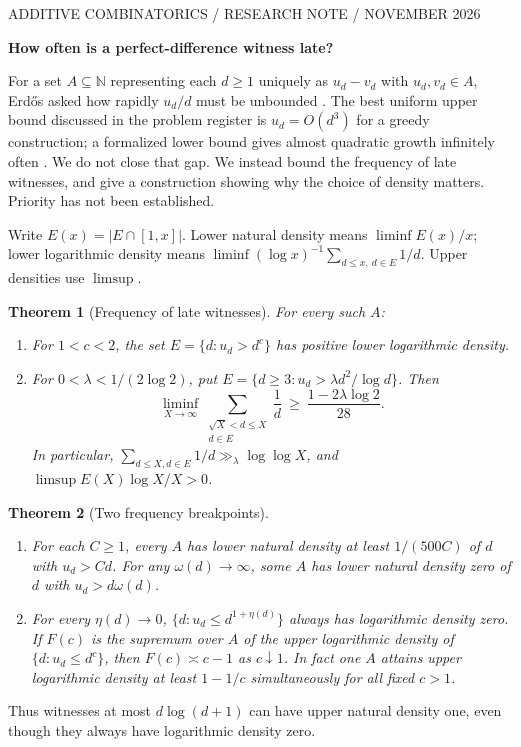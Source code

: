 \documentclass[10pt,a4paper]{article}
\newtheorem{theorem}{Theorem}
\newcommand{\N}{\mathbb N}
\begin{document}
{\small\sffamily\color{ink} ADDITIVE COMBINATORICS \quad / \quad RESEARCH NOTE \quad /  NOVEMBER 2026}
\vspace{3mm}
\begin{center}{\LARGE\bfseries How often is a perfect-difference witness late?}\end{center}
For a set $A\subseteq\N$ representing each $d\ge1$ uniquely as $u_d-v_d$ with $u_d,v_d\in A$, Erd\H os asked how rapidly $u_d/d$ must be unbounded \cite{Erdos}. The best uniform upper bound discussed in the problem register is $u_d=O(d^3)$ for a greedy construction; a formalized lower bound gives almost quadratic growth infinitely often \cite{Mazur}. We do not close that gap. We instead bound the frequency of late witnesses, and give a construction showing why the choice of density matters. Priority has not been established.

Write $E(x)=|E\cap[1,x]|$. Lower natural density means $\liminf E(x)/x$; lower logarithmic density means $\liminf (\log x)^{-1}\sum_{d\le x,\ d\in E}1/d$. Upper densities use $\limsup$.
\begin{theorem}[Frequency of late witnesses]\label{late}
For every such $A$:
\begin{enumerate}
\item For $1<c<2$, the set $E=\{d:u_d>d^c\}$ has positive lower logarithmic density.
\item For $0<\lambda<1/(2\log2)$, put $E=\{d\ge3:u_d>\lambda d^2/\log d\}$. Then
\[
\liminf_{X\to\infty}\sum_{\substack{\sqrt X<d\le X\\d\in E}}\frac1d
\ \ge\ \frac{1-2\lambda\log2}{28}.
\]
In particular, $\sum_{d\le X,d\in E}1/d\gg_\lambda\log\log X$, and $\limsup E(X)\log X/X>0$.
\end{enumerate}
\end{theorem}
\begin{theorem}[Two frequency breakpoints]\label{sharp}
\mbox{}\vspace{-5pt}
\begin{enumerate}
\item For each $C\ge1$, every $A$ has lower natural density at least $1/(500C)$ of $d$ with $u_d>Cd$. For any $\omega(d)\to\infty$, some $A$ has lower natural density zero of $d$ with $u_d>d\omega(d)$.
\item For every $\eta(d)\to0$, $\{d:u_d\le d^{1+\eta(d)}\}$ always has logarithmic density zero. If $F(c)$ is the supremum over $A$ of the upper logarithmic density of $\{d:u_d\le d^c\}$, then $F(c)\asymp c-1$ as $c\downarrow1$. In fact one $A$ attains upper logarithmic density at least $1-1/c$ simultaneously for all fixed $c>1$.
\end{enumerate}
\end{theorem}
Thus witnesses at most $d\log(d+1)$ can have upper natural density one, even though they always have logarithmic density zero.
\end{document}
